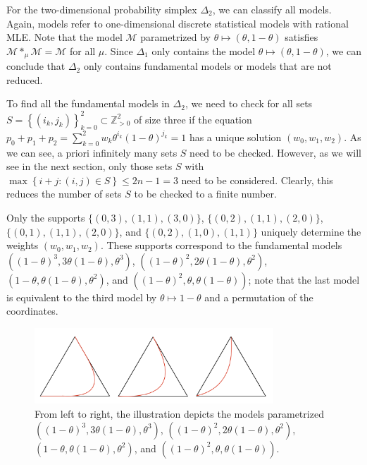 \begin{example}
For the two-dimensional probability simplex \( \Delta_2 \), we can classify all models. Again, models refer to one-dimensional discrete statistical models with rational MLE. Note that the model \( \mathcal{M} \) parametrized by \( \theta \mapsto (\theta, 1-\theta) \) satisfies \( \mathcal{M} *_\mu \mathcal{M} = \mathcal{M} \) for all \( \mu \). Since \( \Delta_1 \) only contains the model \( \theta \mapsto (\theta, 1-\theta) \), we can conclude that \( \Delta_2 \) only contains fundamental models or models that are not reduced.

To find all the fundamental models in \( \Delta_2 \), we need to check for all sets \( S = \left\{ (i_k,j_k)\right\}_{k=0}^2 \subset \mathbb{Z}^2_{>0} \) of size three if the equation \( p_0 + p_1 + p_2 = \sum_{k=0}^2 w_k \theta^{i_k}(1-\theta)^{j_k} = 1 \) has a unique solution \( (w_0, w_1, w_2) \). As we can see, a priori infinitely many sets \( S \) need to be checked. However, as we will see in the next section, only those sets \( S \) with \( \max\left\{ i+j : (i,j) \in S \right\} \leq 2n -1 = 3 \) need to be considered. Clearly, this reduces the number of sets \( S \) to be checked to a finite number.

Only the supports \( \{ (0,3), (1,1), (3,0) \}\), \( \{ (0,2), (1,1), (2,0) \}\), \( \{ (0,1), (1,1), (2,0) \} \), and \( \{ (0,2),(1,0),(1,1) \} \) uniquely determine the weights \( (w_0, w_1, w_2) \). 
These supports correspond to the fundamental models \( ((1-\theta)^3, 3\theta(1-\theta), \theta^3) \), \( ((1-\theta)^2, 2\theta(1-\theta), \theta^2) \), \( (1-\theta, \theta(1-\theta), \theta^2) \), and \( ((1-\theta)^2, \theta, \theta(1-\theta)) \); note that the last model is equivalent to the third model by \( \theta \mapsto 1-\theta \) and a permutation of the coordinates.

\begin{figure}[H]
    \centering
    \includegraphics[width=0.8\textwidth]{assets/fundamental-models-delta-2.png}
    \caption{From left to right, the illustration depicts the models parametrized \( ((1-\theta)^3, 3\theta(1-\theta), \theta^3) \), \( ((1-\theta)^2, 2\theta(1-\theta), \theta^2) \), \( (1-\theta, \theta(1-\theta), \theta^2) \), and \( ((1-\theta)^2, \theta, \theta(1-\theta)) \).}


\end{figure}
\end{example}
